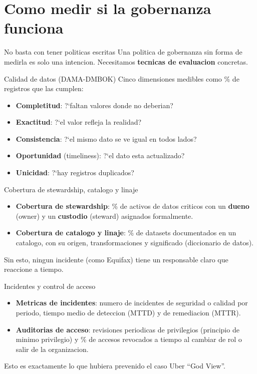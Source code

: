 \documentclass[aspectratio=169]{beamer}
\begin{document}
\section{Como medir si la gobernanza funciona}

\begin{frame}{No basta con tener politicas escritas}
  Una politica de gobernanza sin forma de medirla es solo una intencion.
  Necesitamos \textbf{tecnicas de evaluacion} concretas.
\end{frame}

\begin{frame}{Calidad de datos (DAMA-DMBOK)}
  Cinco dimensiones medibles como \% de registros que las cumplen:
  \begin{itemize}
    \item \textbf{Completitud}: ?`faltan valores donde no deberian?
    \item \textbf{Exactitud}: ?`el valor refleja la realidad?
    \item \textbf{Consistencia}: ?`el mismo dato se ve igual en todos lados?
    \item \textbf{Oportunidad} (timeliness): ?`el dato esta actualizado?
    \item \textbf{Unicidad}: ?`hay registros duplicados?
  \end{itemize}
\end{frame}

\begin{frame}{Cobertura de stewardship, catalogo y linaje}
  \begin{itemize}
    \item \textbf{Cobertura de stewardship}: \% de activos de datos criticos
          con un \textbf{dueno} (owner) y un \textbf{custodio} (steward)
          asignados formalmente.
    \item \textbf{Cobertura de catalogo y linaje}: \% de datasets
          documentados en un catalogo, con su origen, transformaciones y
          significado (diccionario de datos).
  \end{itemize}
  \vspace{0.2em}
  Sin esto, ningun incidente (como Equifax) tiene un responsable claro que
  reaccione a tiempo.
\end{frame}

\begin{frame}{Incidentes y control de acceso}
  \begin{itemize}
    \item \textbf{Metricas de incidentes}: numero de incidentes de seguridad
          o calidad por periodo, tiempo medio de deteccion (MTTD) y de
          remediacion (MTTR).
    \item \textbf{Auditorias de acceso}: revisiones periodicas de
          privilegios (principio de minimo privilegio) y \% de accesos
          revocados a tiempo al cambiar de rol o salir de la organizacion.
  \end{itemize}
  \vspace{0.2em}
  Esto es exactamente lo que hubiera prevenido el caso Uber ``God View''.
\end{frame}
\end{document}
